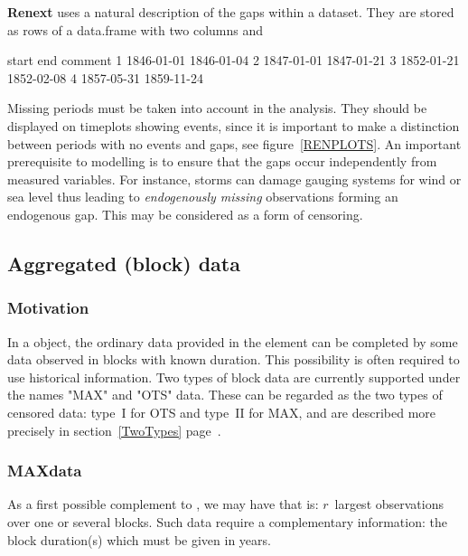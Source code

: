 \documentclass[a4paper]{report}
\begin{document}
\textbf{Renext} uses a natural description of the gaps within a
dataset. They are stored as rows of a data.frame with two \verb@POSIX@
columns \verb@start@ and \verb@end@

\begin{Schunk}
\begin{Soutput}
       start        end comment
1 1846-01-01 1846-01-04        
2 1847-01-01 1847-01-21        
3 1852-01-21 1852-02-08        
4 1857-05-31 1859-11-24        
\end{Soutput}
\end{Schunk}

\noindent
Missing periods must be taken into account in the analysis. They
should be displayed on timeplots showing events, since it is
important to make a distinction between periods with no events and
gaps, see figure~\ref{RENPLOTS}. An important prerequisite to modelling
is to ensure that the gaps occur independently from measured
variables. For instance, storms can damage gauging systems for wind or
sea level thus leading to \textit{endogenously missing} observations forming an 
endogenous gap. This may be considered as a form of censoring.


\subsection{Aggregated (block) data}
% 
\label{HistoricalData}
%

\subsubsection*{Motivation}
In a \verb@Rendata@ object, the ordinary data provided in the
\verb@OTdata@ element can be completed by some data observed in
blocks with known duration. This possibility is often
required to use historical information.  Two types of block data are
currently supported under the names "MAX" and "OTS" data.  These 
can be regarded as the two types of censored data: type~I
for OTS and type~II for MAX, and are described more precisely
in section~\ref{TwoTypes}
page~\pageref{TwoTypes}.

\subsubsection*{MAXdata}
%
As a first possible complement to \verb@OTdata@, we may have \verb@MAXdata@ that
is: $r$~largest observations over one or several blocks. Such
data require a complementary information: the block duration(s) which
must be given in years.
\end{document}
